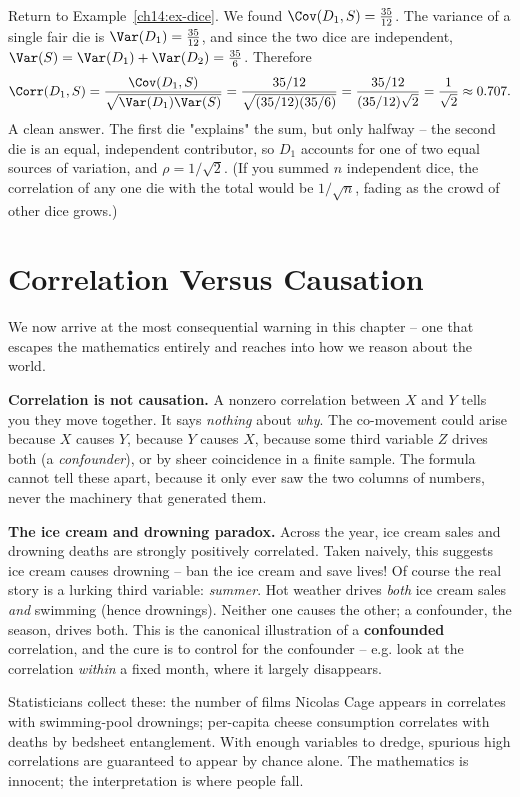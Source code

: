 \begin{example}[$\Corr(D_1, S)$]
\label{ch14:ex-corr-dice}
Return to Example~\ref{ch14:ex-dice}. We found $\Cov(D_1, S) = \tfrac{35}{12}$.
The variance of a single fair die is $\Var(D_1) = \tfrac{35}{12}$, and since the
two dice are independent, $\Var(S) = \Var(D_1) + \Var(D_2) = \tfrac{35}{6}$.
Therefore
\[
\Corr(D_1, S) = \frac{\Cov(D_1, S)}{\sqrt{\Var(D_1)\Var(S)}}
= \frac{35/12}{\sqrt{(35/12)(35/6)}}
= \frac{35/12}{(35/12)\sqrt{2}}
= \frac{1}{\sqrt{2}} \approx 0.707.
\]
A clean answer. The first die "explains" the sum, but only halfway -- the second
die is an equal, independent contributor, so $D_1$ accounts for one of two equal
sources of variation, and $\rho = 1/\sqrt 2$. (If you summed $n$ independent dice,
the correlation of any one die with the total would be $1/\sqrt n$, fading as the
crowd of other dice grows.)
\end{example}

\section{Correlation Versus Causation}
\label{ch14:causation}

We now arrive at the most consequential warning in this chapter -- one that escapes
the mathematics entirely and reaches into how we reason about the world.

\begin{trapbox}
\textbf{Correlation is not causation.} A nonzero correlation between $X$ and $Y$
tells you they move together. It says \emph{nothing} about \emph{why}. The
co-movement could arise because $X$ causes $Y$, because $Y$ causes $X$, because some
third variable $Z$ drives both (a \emph{confounder}), or by sheer coincidence in a
finite sample. The formula cannot tell these apart, because it only ever saw the two
columns of numbers, never the machinery that generated them.
\end{trapbox}

\begin{paradoxbox}
\textbf{The ice cream and drowning paradox.} Across the year, ice cream sales and
drowning deaths are strongly positively correlated. Taken naively, this suggests ice
cream causes drowning -- ban the ice cream and save lives! Of course the real story
is a lurking third variable: \emph{summer}. Hot weather drives \emph{both} ice cream
sales \emph{and} swimming (hence drownings). Neither one causes the other; a
confounder, the season, drives both. This is the canonical illustration of a
\textbf{confounded} correlation, and the cure is to control for the confounder --
e.g. look at the correlation \emph{within} a fixed month, where it largely
disappears.

Statisticians collect these: the number of films Nicolas Cage appears in correlates
with swimming-pool drownings; per-capita cheese consumption correlates with deaths
by bedsheet entanglement. With enough variables to dredge, spurious high
correlations are guaranteed to appear by chance alone. The mathematics is innocent;
the interpretation is where people fall.
\end{paradoxbox}

